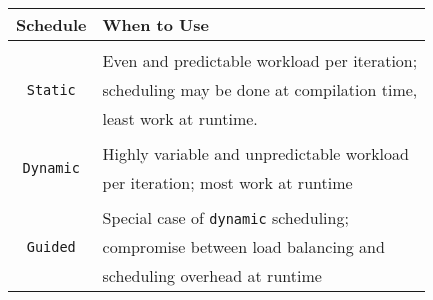 \documentclass[slidestop,mathserif,compress,xcolor=svgnames]{beamer}
\newenvironment{bblock}[0]
{
\begin{beamerboxesrounded}[upper=uppercol1,lower=lowercol1,shadow=true]}
{\end{beamerboxesrounded}}
\begin{document}
\begin{frame}[allowframebreaks]
  \begin{bblock}{}
    \begin{center}
      \begin{tabular}{cl}
        Schedule & When to Use \\
        \hline\\
        \multirow{3}{*}{\texttt{Static}} & Even and predictable workload per iteration; \\
        & scheduling may be done at compilation time,\\ 
        & least work at runtime.\\
        \\
        \multirow{2}{*}{\texttt{Dynamic}} & Highly variable and unpredictable workload \\
        & per iteration; most work at runtime \\
        \\
        \multirow{3}{*}{\texttt{Guided}} & Special case of \texttt{dynamic} scheduling; \\
        & compromise between load balancing and \\
        & scheduling overhead at runtime \\
      \end{tabular}
    \end{center}
  \end{bblock}
\end{frame}
\end{document}
